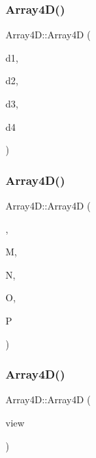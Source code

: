 \mbox{\label{class_array4_d_a2b0e0536b5e40fec5694fdcaebdcff6a}} 
\subsubsection{\texorpdfstring{Array4\+D()}{Array4D()}\hspace{0.1cm}{\footnotesize\ttfamily [3/5]}}
{\footnotesize\ttfamily Array4\+D\+::\+Array4D (\begin{DoxyParamCaption}\item[{size\+\_\+t}]{d1,  }\item[{size\+\_\+t}]{d2,  }\item[{size\+\_\+t}]{d3,  }\item[{size\+\_\+t}]{d4 }\end{DoxyParamCaption})}

\mbox{\label{class_array4_d_a8ee78d0fd3a893d067386b1afd9a742e}} 
\subsubsection{\texorpdfstring{Array4\+D()}{Array4D()}\hspace{0.1cm}{\footnotesize\ttfamily [4/5]}}
{\footnotesize\ttfamily Array4\+D\+::\+Array4D (\begin{DoxyParamCaption}\item[{std\+::vector$<$ double $>$ const \&}]{,  }\item[{size\+\_\+t}]{M,  }\item[{size\+\_\+t}]{N,  }\item[{size\+\_\+t}]{O,  }\item[{size\+\_\+t}]{P }\end{DoxyParamCaption})}

\mbox{\label{class_array4_d_a5c5b3aa5f576edefc2e9a61afa87e451}} 
\subsubsection{\texorpdfstring{Array4\+D()}{Array4D()}\hspace{0.1cm}{\footnotesize\ttfamily [5/5]}}
{\footnotesize\ttfamily Array4\+D\+::\+Array4D (\begin{DoxyParamCaption}\item[{Array4\+D\+::array\+\_\+view$<$ 4 $>$\+::type \&}]{view }\end{DoxyParamCaption})}

